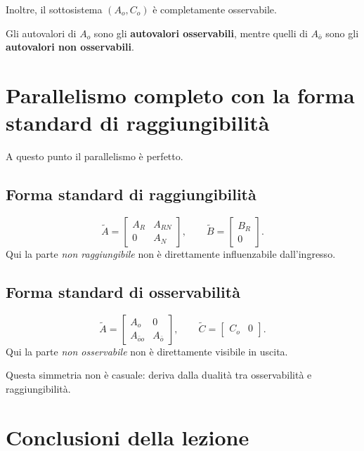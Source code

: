 Inoltre, il sottosistema \((A_o,C_o)\) è completamente osservabile.

\medskip

Gli autovalori di \(A_o\) sono gli \textbf{autovalori osservabili}, mentre quelli di \(A_{\bar o}\) sono gli \textbf{autovalori non osservabili}.

\section{Parallelismo completo con la forma standard di raggiungibilità}

A questo punto il parallelismo è perfetto.

\subsection*{Forma standard di raggiungibilità}
\[
\widetilde A=
\begin{bmatrix}
A_R & A_{RN}\\
0 & A_N
\end{bmatrix},
\qquad
\widetilde B=
\begin{bmatrix}
B_R\\
0
\end{bmatrix}.
\]
Qui la parte \emph{non raggiungibile} non è direttamente influenzabile dall'ingresso.

\subsection*{Forma standard di osservabilità}
\[
\widetilde A=
\begin{bmatrix}
A_o & 0\\
A_{\bar o o} & A_{\bar o}
\end{bmatrix},
\qquad
\widetilde C=
\begin{bmatrix}
C_o & 0
\end{bmatrix}.
\]
Qui la parte \emph{non osservabile} non è direttamente visibile in uscita.

\medskip

Questa simmetria non è casuale: deriva dalla dualità tra osservabilità e raggiungibilità.

\section{Conclusioni della lezione}

